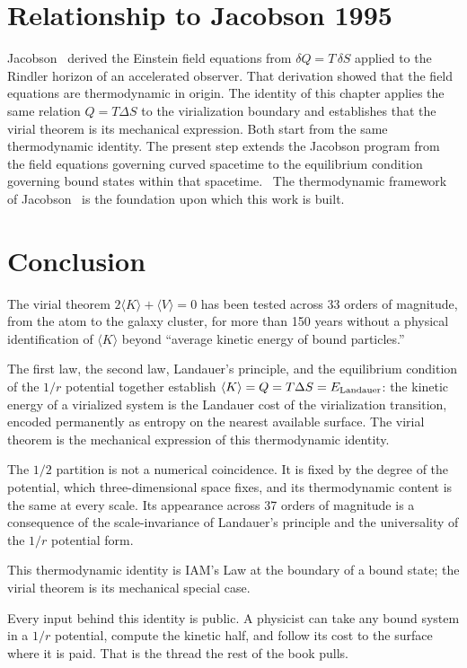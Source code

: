 \section{Relationship to Jacobson 1995}\label{sec:vi_jacobson}
Jacobson~\cite{Jacobson1995} derived the Einstein field equations from $\delta Q=T\,\delta S$ applied to the Rindler horizon of an accelerated observer.
That derivation showed that the field equations are thermodynamic in origin. The identity of this chapter applies the same relation $Q=T\Delta S$ to the
virialization boundary and establishes that the virial theorem is its mechanical expression. Both start from the same thermodynamic identity. The present
step extends the Jacobson program from the field equations governing curved spacetime to the equilibrium condition governing bound states within that
spacetime. \interp\ The thermodynamic framework of Jacobson~\cite{Jacobson1995} is the foundation upon which this work is built.

\section{Conclusion}\label{sec:vi_conclusion}
The virial theorem $2\langle K\rangle+\langle V\rangle=0$ has been tested across 33 orders of magnitude, from the atom to the galaxy cluster, for more than 150 years without a physical
identification of $\langle K\rangle$ beyond ``average kinetic energy of bound particles.'' \observed

The first law, the second law, Landauer's principle, and the equilibrium condition of the $1/r$ potential together establish $\langle K\rangle=Q=T\Delta
S=E_{\rm Landauer}$: the kinetic energy of a virialized system is the Landauer cost of the virialization transition, encoded permanently as entropy on the
nearest available surface. The virial theorem is the mechanical expression of this thermodynamic identity. \interp

The $1/2$ partition is not a numerical coincidence. It is fixed by the degree of the potential, which three-dimensional space fixes, and its thermodynamic
content is the same at every scale. Its appearance across 37 orders of magnitude is a consequence of the scale-invariance of Landauer's principle and the
universality of the $1/r$ potential form. \interp

This thermodynamic identity is IAM's Law at the boundary of a bound state; the virial theorem is its mechanical special case. \interp

Every input behind this identity is public. A physicist can take any bound system in a $1/r$ potential, compute the kinetic half, and follow its cost to the surface where it is paid. That is the thread the rest of the book pulls.
